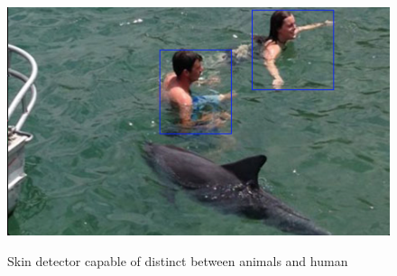 \begin{figure}[H]
\centering
\includegraphics[width=\textwidth]{Images/humanDolphin.png}
\label{fig:humanAndDolphin}
\caption{Skin detector capable of distinct between animals and human}
\end{figure}
